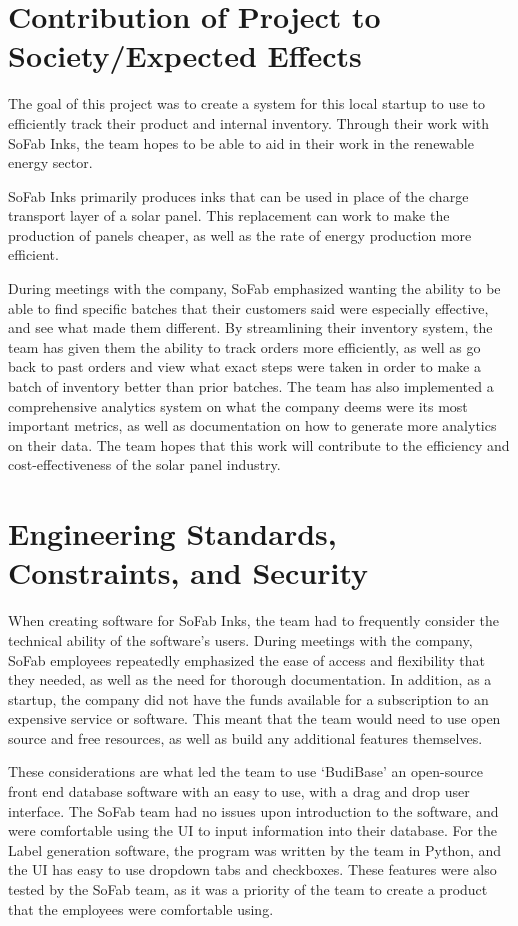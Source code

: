 \documentclass{article}
\begin{document}
\section{Contribution of Project to Society\slash Expected Effects}
The goal of this project was to create a system for this local startup to use to efficiently track their product and internal 
inventory. Through their work with SoFab Inks, the team hopes to be able to aid in their work in the renewable energy sector. 

SoFab Inks primarily produces inks that can be used in place of the charge transport layer of a solar panel. This replacement can 
work to make the production of panels cheaper, as well as the rate of energy production more efficient.  

During meetings with the company, SoFab emphasized wanting the ability to be able to find specific batches that their customers 
said were especially effective, and see what made them different. By streamlining their inventory system, the team has given them 
the ability to track orders more efficiently, as well as go back to past orders and view what exact steps were taken in order to 
make a batch of inventory better than prior batches. The team has also implemented a comprehensive analytics system on what the 
company deems were its most important metrics, as well as documentation on how to generate more analytics on their data. The team 
hopes that this work will contribute to the efficiency and cost-effectiveness of the solar panel industry.  
\section{Engineering Standards, Constraints, and Security}
When creating software for SoFab Inks, the team had to frequently consider the technical ability of the software's users. During 
meetings with the company, SoFab employees repeatedly emphasized the ease of access and flexibility that they needed, as well as the 
need for thorough documentation. In addition, as a startup, the company did not have the funds available for a subscription to an 
expensive service or software. This meant that the team would need to use open source and free resources, as well as build any 
additional features themselves. 

These considerations are what led the team to use `BudiBase' an open-source front end database software with an easy to use, with 
a drag and drop user interface. The SoFab team had no issues upon introduction to the software, and were comfortable using the UI 
to input information into their database. For the Label generation software, the program was written by the team in Python, and 
the UI has easy to use dropdown tabs and checkboxes. These features were also tested by the SoFab team, as it was a priority of 
the team to create a product that the employees were comfortable using.  
\end{document}
